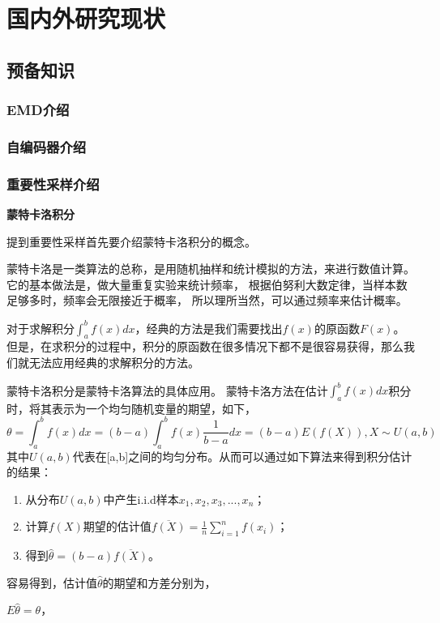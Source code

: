 
\chapter{国内外研究现状}
\section{预备知识}
\subsection{EMD介绍}
\subsection{自编码器介绍}
\subsection{重要性采样介绍}
\textbf{蒙特卡洛积分}

提到重要性采样首先要介绍蒙特卡洛积分的概念。

蒙特卡洛是一类算法的总称，是用随机抽样和统计模拟的方法，来进行数值计算。
它的基本做法是，做大量重复实验来统计频率，
根据伯努利大数定律，当样本数足够多时，频率会无限接近于概率，
所以理所当然，可以通过频率来估计概率。

对于求解积分$\int_a^b f(x)dx$，经典的方法是我们需要找出$f(x)$的原函数$F(x)$。
但是，在求积分的过程中，积分的原函数在很多情况下都不是很容易获得，那么我们就无法应用经典的求解积分的方法。

蒙特卡洛积分是蒙特卡洛算法的具体应用。
蒙特卡洛方法在估计$\int_a^b f(x)dx$积分时，将其表示为一个均匀随机变量的期望，如下，
\begin{equation}
    \theta=\int_a^b f(x)dx = (b-a)\int_a^b f(x) \frac{1}{b-a}dx=(b-a)E(f(X)), X\sim U(a,b)
\end{equation}
其中$U(a,b)$代表在[a,b]之间的均匀分布。从而可以通过如下算法来得到积分估计的结果：
\begin{enumerate}
    \item 从分布$U(a,b)$中产生i.i.d样本$x_1,x_2,x_3,...,x_n$；
    \item 计算$f(X)$期望的估计值$\overline{f(X)}=\frac{1}{n}\sum_{i=1}^{n} f(x_i)$；
    \item 得到$\hat{\theta}=(b-a)\overline{f(X)}$。
\end{enumerate}
容易得到，估计值$\hat{\theta}$的期望和方差分别为，

$E\hat{\theta}=\theta$，

